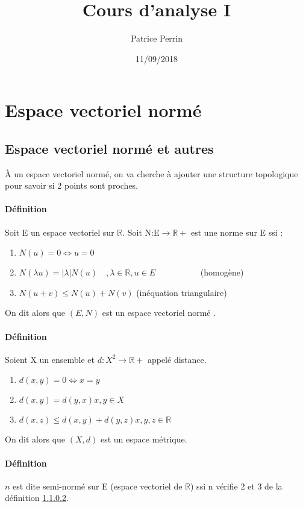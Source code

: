 \documentclass[a4paper, oneside]{report}
\newcommand{\R}{\mathbb{R}}
\newcommand{\ev}{espace vectoriel }
\newcommand{\evn}{espace vectoriel normé }
\newcommand{\defi}{\subsubsection{Définition}}
\begin{document}
\title{Cours d'analyse I}
\date{11/09/2018}
\author{Patrice Perrin}
\maketitle

\tableofcontents{}
\chapter{Espace vectoriel normé}

\section{Espace vectoriel normé et autres}

À un \ev normé, on va cherche à ajouter une structure topologique pour savoir si 2 points sont proches.

\defi
Soit E un \ev sur $\R$. Soit N:E$\rightarrow \R+$ est une norme sur E ssi :

\begin{enumerate}
\item $N(u)=0 \Leftrightarrow u=0$
\item $N(\lambda u)=|\lambda| N(u)\hspace{1em}, \lambda\in \R, u\in E \hspace{5em}$ (homogène)
\item $N(u+v)\leq N(u)+N(v)$ \hspace{5em} (inéquation triangulaire)
\end{enumerate}
On dit alors que $(E, N)$ est un \evn.

\defi
\label{def-evm}
Soient X un ensemble et $d:X^2\rightarrow \R+$ appelé distance.

\begin{enumerate}
\item $d(x,y) = 0 \Leftrightarrow x=y$
\item $d(x,y)=d(y,x)$\hspace{1em}$x,y\in X$
\item $d(x,z)\leq d(x,y)+d(y,z)$\hspace{1em}$x,y,z\in \R$
\end{enumerate}
On dit alors que $(X,d)$ est un espace métrique.


\subsubsection{Définition}
$n$ est dite semi-normé sur E (\ev de $\R$) ssi n vérifie 2 et 3 de la définition \ref{def-evm}.
\end{document}
